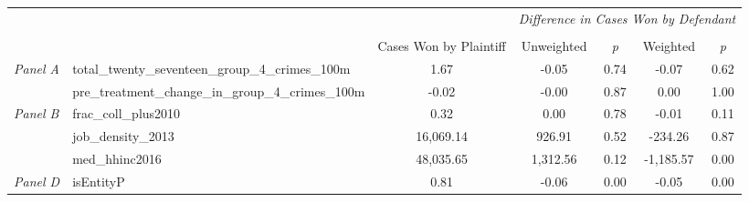 \begin{tabular}{llccccc}
\toprule
 &  & \textit{} & \multicolumn{4}{c}{\textit{Difference in Cases Won by Defendant}} \\
\cline{4-7}
\\
 &  & Cases Won by Plaintiff & Unweighted & \emph{p} & Weighted & \emph{p} \\
\midrule
\multirow[c]{2}{3cm}{\textit{Panel A}} & total_twenty_seventeen_group_4_crimes_100m & 1.67 & -0.05 & 0.74 & -0.07 & 0.62 \\
 & pre_treatment_change_in_group_4_crimes_100m & -0.02 & -0.00 & 0.87 & 0.00 & 1.00 \\
\cline{1-7}
\multirow[c]{3}{3cm}{\textit{Panel B}} & frac_coll_plus2010 & 0.32 & 0.00 & 0.78 & -0.01 & 0.11 \\
 & job_density_2013 & 16,069.14 & 926.91 & 0.52 & -234.26 & 0.87 \\
 & med_hhinc2016 & 48,035.65 & 1,312.56 & 0.12 & -1,185.57 & 0.00 \\
\cline{1-7}
\textit{Panel D} & isEntityP & 0.81 & -0.06 & 0.00 & -0.05 & 0.00 \\
\cline{1-7}
\bottomrule
\end{tabular}
